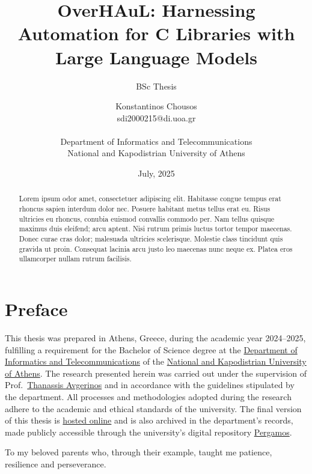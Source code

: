 \documentclass[
  a4paper,
]{scrreprt}
\title{OverHAuL: Harnessing Automation for C Libraries with Large
Language Models}
\subtitle{BSc Thesis}
\author{
	Konstantinos Chousos \orcidlink{0009-0008-6063-7915}
	\\\medskip sdi2000215@di.uoa.gr%
	\\\medskip
	\\\medskip
	Department of Informatics and Telecommunications
	\\\medskip
	National and Kapodistrian University of Athens
}
\date{July, 2025}
\theoremstyle{definition}
\theoremstyle{remark}
\begin{document}
\maketitle
\begin{abstract}
Lorem ipsum odor amet, consectetuer adipiscing elit. Habitasse congue
tempus erat rhoncus sapien interdum dolor nec. Posuere habitant metus
tellus erat eu. Risus ultricies eu rhoncus, conubia euismod convallis
commodo per. Nam tellus quisque maximus duis eleifend; arcu aptent. Nisi
rutrum primis luctus tortor tempor maecenas. Donec curae cras dolor;
malesuada ultricies scelerisque. Molestie class tincidunt quis gravida
ut proin. Consequat lacinia arcu justo leo maecenas nunc neque ex.
Platea eros ullamcorper nullam rutrum facilisis.
\end{abstract}





\chapter*{Preface}\label{preface}


This thesis was prepared in Athens, Greece, during the academic year
2024--2025, fulfilling a requirement for the Bachelor of Science degree
at the \href{https://www.di.uoa.gr/en}{Department of Informatics and
Telecommunications} of the \href{https://en.uoa.gr/}{National and
Kapodistrian University of Athens}. The research presented herein was
carried out under the supervision of
Prof.~\href{https://cgi.di.uoa.gr/~thanassis/}{Thanassis Avgerinos} and
in accordance with the guidelines stipulated by the department. All
processes and methodologies adopted during the research adhere to the
academic and ethical standards of the university. The final version of
this thesis is \href{https://kchousos.github.io/BSc-Thesis/}{hosted
online} and is also archived in the department's records, made publicly
accessible through the university's digital repository
\href{https://pergamos.lib.uoa.gr/}{Pergamos}.

\newpage{}

\clearpage
\thispagestyle{empty}
\vspace*{0.3\textheight}
\begin{flushright}
\itshape
 
To my beloved parents who, through their example, taught me patience, resilience and perseverance.

\end{flushright}
\newpage
\end{document}
